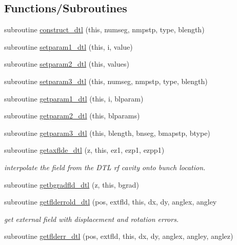\subsection*{Functions/\+Subroutines}
\begin{DoxyCompactItemize}
\item 
subroutine \mbox{\hyperlink{namespacedtlclass_a5f65e89a18b2765e966ea8c1db85aa0c}{construct\+\_\+dtl}} (this, numseg, nmpstp, type, blength)
\item 
subroutine \mbox{\hyperlink{namespacedtlclass_aa8af784d85ac535b6238e9dd4d844be9}{setparam1\+\_\+dtl}} (this, i, value)
\item 
subroutine \mbox{\hyperlink{namespacedtlclass_a267abecac3bfad96fd1ce717ba50c8b4}{setparam2\+\_\+dtl}} (this, values)
\item 
subroutine \mbox{\hyperlink{namespacedtlclass_aaccb0362c1862fd4f4e34a23f1bb25b9}{setparam3\+\_\+dtl}} (this, numseg, nmpstp, type, blength)
\item 
subroutine \mbox{\hyperlink{namespacedtlclass_abd0fd1a590b8e198a5b7081e105f11e8}{getparam1\+\_\+dtl}} (this, i, blparam)
\item 
subroutine \mbox{\hyperlink{namespacedtlclass_aac10b9bb174a986cd15c1f0a11369c57}{getparam2\+\_\+dtl}} (this, blparams)
\item 
subroutine \mbox{\hyperlink{namespacedtlclass_adb7337b9d81c5d4fef24ba72ad107cbe}{getparam3\+\_\+dtl}} (this, blength, bnseg, bmapstp, btype)
\item 
subroutine \mbox{\hyperlink{namespacedtlclass_a1fb756446dfd217cc32e4a9088e7f4c7}{getaxflde\+\_\+dtl}} (z, this, ez1, ezp1, ezpp1)
\begin{DoxyCompactList}\small\item\em interpolate the field from the D\+TL rf cavity onto bunch location. \end{DoxyCompactList}\item 
subroutine \mbox{\hyperlink{namespacedtlclass_a79f0618eb609338c97470f6f8f05a848}{getbgradfld\+\_\+dtl}} (z, this, bgrad)
\item 
subroutine \mbox{\hyperlink{namespacedtlclass_aa42e9d402234d9be025275b620c42326}{getflderrold\+\_\+dtl}} (pos, extfld, this, dx, dy, anglex, angley
\begin{DoxyCompactList}\small\item\em get external field with displacement and rotation errors. \end{DoxyCompactList}\item 
subroutine \mbox{\hyperlink{namespacedtlclass_ab866f108c00b307f9e7a55731eadafa4}{getflderr\+\_\+dtl}} (pos, extfld, this, dx, dy, anglex, angley, anglez)

\end{DoxyCompactItemize}
